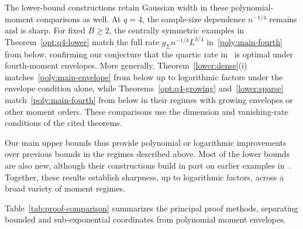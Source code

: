 \documentclass[11pt,letterpaper]{article}
\theoremstyle{remark}
\begin{document}
The lower-bound constructions retain Gaussian width in these
polynomial-moment comparisons as well. At \(q=4\), the
sample-size dependence \(n^{-1/4}\) remains and is sharp.
For fixed \(B\ge2\), the centrally symmetric examples in
Theorem~\ref{opt:q4-lower} match the full rate
\(g_\Sigma n^{-1/4}L^{3/4}\) in~\eqref{poly:main-fourth}
from below, confirming our conjecture that the quartic rate
in~\cite[Theorem~2.5]{CCKK2022} is optimal under fourth-moment
envelopes. More generally, Theorem~\ref{lower:dense}\textup{(i)}
matches~\eqref{poly:main-envelope} from below up to logarithmic
factors under the envelope condition alone, while
Theorems~\ref{opt:q4-growing} and~\ref{lower:sparse}
match~\eqref{poly:main-fourth} from below in their regimes with
growing envelopes or other moment orders. These comparisons use
the dimension and vanishing-rate conditions of the cited theorems.

Our main upper bounds thus provide polynomial or logarithmic
improvements over previous bounds in the regimes described above.
Most of the lower bounds are also new, although their constructions
build in part on earlier examples in~\cite{CCK,FKLZ}. Together,
these results establish sharpness, up to logarithmic factors,
across a broad variety of moment regimes.

Table~\ref{tab:proof-comparison} summarizes the principal proof
methods, separating bounded and sub-exponential coordinates from
polynomial moment envelopes.
\end{document}
